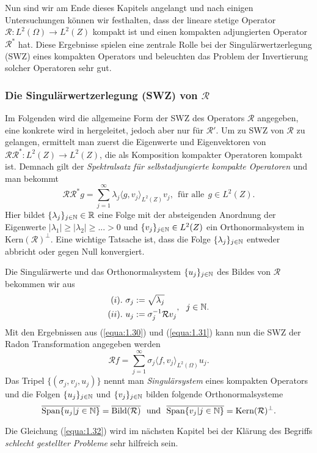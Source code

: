Nun sind wir am Ende dieses Kapitels angelangt und nach einigen Untersuchungen können wir festhalten, dass der lineare stetige Operator $\mathcal{R} : L^2(\Omega) \rightarrow L^2(Z)$ kompakt ist und einen kompakten adjungierten Operator $\mathcal{R^*}$ hat. Diese Ergebnisse spielen eine zentrale Rolle bei der Singulärwertzerlegung (SWZ) eines kompakten Operators und beleuchten das Problem der Invertierung solcher Operatoren sehr gut.

\subsubsection{Die Singulärwertzerlegung (SWZ) von $\mathcal{R}$}

Im Folgenden wird die allgemeine Form der SWZ des Operators $\mathcal{R}$ angegeben, eine konkrete wird in \cite[Kap. 2.5]{Rieder03} hergeleitet, jedoch aber nur für $\mathcal{R}'$. Um zu SWZ von $\mathcal{R}$ zu gelangen, ermittelt man zuerst die Eigenwerte und Eigenvektoren von $\mathcal{R}\mathcal{R^*} : L^2(Z) \rightarrow L^2(Z)$, die als Komposition kompakter Operatoren kompakt ist. Demnach gilt der \textit{Spektralsatz für selbstadjungierte kompakte Operatoren} \cite[S. 30]{Rieder03} und man bekommt 
\begin{equation}
	\mathcal{R}\mathcal{R^*}g = \sum\limits_{j=1}^{\infty} \lambda_j \langle g, v_j \rangle_{L^2(Z)} v_j, \ \ \mbox{für alle} \ \ g \in L^2(Z).
	\label{equa:1.30}
\end{equation}
Hier bildet $\{ \lambda_j \}_{j \in \mathbb{N}} \in \mathbb{R}$ eine Folge mit der absteigenden Anordnung der Eigenwerte $|\lambda_1| \geq |\lambda_2| \geq ... > 0$ und $\{ v_j\}_{j \in \mathbb{N}} \in L^2(Z)$ ein Orthonormalsystem in $\mbox{Kern}(\mathcal{R})^{\perp}$. Eine wichtige Tatsache ist, dass die Folge $\{\lambda_j\}_{j \in \mathbb{N}}$ entweder abbricht oder gegen Null konvergiert.

Die Singulärwerte und das Orthonormalsystem $\{u_j\}_{j \in \mathbb{N}}$ des Bildes von $\mathcal{R}$ bekommen wir aus
\begin{equation}
	\begin{split}
		(i). \ \sigma_j &:= \sqrt{\lambda_j}\\ 
		(ii). \ u_j	&:= \sigma_j^{-1}\mathcal{R}v_j
	\end{split}
	 , \ \  j \in \mathbb{N}.
	 \label{equa:1.31}
\end{equation}
Mit den Ergebnissen aus (\ref{equa:1.30}) und (\ref{equa:1.31}) kann nun die SWZ der Radon Transformation angegeben werden
\begin{equation}
	\mathcal{R}f = \sum\limits_{j = 1}^{\infty} \sigma_j \langle f, v_j\rangle_{L^2(\Omega)} u_j.
	\label{equa:1.32}
\end{equation}
Das Tripel $\{(\sigma_j, v_j, u_j)\}$ nennt man \textit{Singulärsystem} eines kompakten Operators und die Folgen $\{u_j\}_{j \in \mathbb{N}}$ und $\{ v_j\}_{j \in \mathbb{N}}$ bilden folgende Orthonormalsysteme
\begin{equation}
	\overline{\mbox{Span}\{u_j | j \in \N \} } = \overline{\mbox{Bild}(\mathcal{R})} \ \ \mbox{und} \ \ \overline{\mbox{Span}\{v_j | j \in \N \} } = \mbox{Kern}(\mathcal{R})^{\perp}.
	\label{equa:1.33}
\end{equation}

Die Gleichung (\ref{equa:1.32}) wird im nächsten Kapitel bei der Klärung des Begriffs \textit{schlecht gestellter Probleme} sehr hilfreich sein. 






